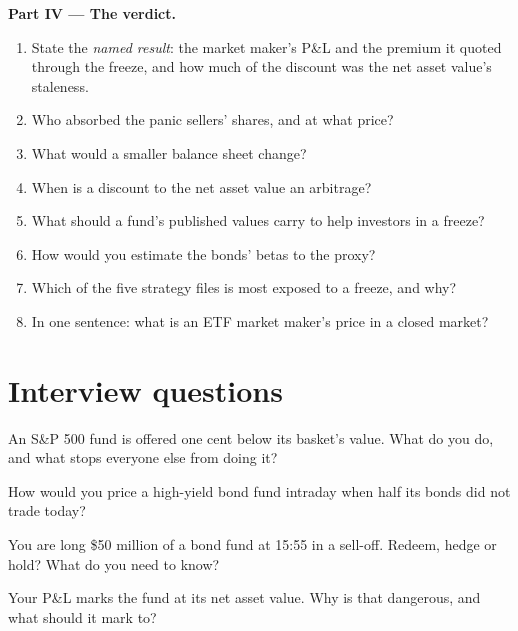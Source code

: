 \begin{problem}
\medskip\noindent\textbf{Part IV --- The verdict.}
\begin{enumerate}[resume]
\item State the \emph{named result}: the market maker's P\&L and the premium it quoted through the freeze, and how much of the discount was the net
asset value's staleness.
\item Who absorbed the panic sellers' shares, and at what price?
\item What would a smaller balance sheet change?
\item When is a discount to the net asset value an arbitrage?
\item What should a fund's published values carry to help investors in a freeze?
\item How would you estimate the bonds' betas to the proxy?
\item Which of the five strategy files is most exposed to a freeze, and why?
\item In one sentence: what is an ETF market maker's price in a closed market?
\end{enumerate}
\end{problem}

\section{Interview questions}

\begin{interviewq}\label{iq:hf:etf-market-making:1}
An S\&P 500 fund is offered one cent below its basket's value. What do you do, and what stops everyone else from doing it?
\end{interviewq}

\begin{interviewq}\label{iq:hf:etf-market-making:2}
How would you price a high-yield bond fund intraday when half its bonds did not trade today?
\end{interviewq}

\begin{interviewq}\label{iq:hf:etf-market-making:3}
You are long \$50 million of a bond fund at 15:55 in a sell-off. Redeem, hedge or hold? What do you need to know?
\end{interviewq}

\begin{interviewq}\label{iq:hf:etf-market-making:4}
Your P\&L marks the fund at its net asset value. Why is that dangerous, and what should it mark to?
\end{interviewq}

